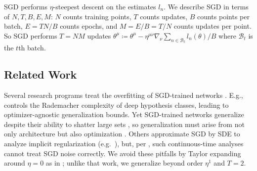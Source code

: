 \documentclass{article}
\theoremstyle{plain}
\theoremstyle{definition}
\newcommand{\Bb}{\mathcal{B}}
\begin{document}

        SGD performs $\eta$-steepest descent on the estimates $l_n$.
        We describe SGD in terms of $N,T,B,E,M$:
            $N$ counts training points,
            $T$ counts updates,
            $B$ counts points per batch,
            $E=TN/B$ counts epochs, 
            and $M=E/B=T/N$ counts updates per point.
        So SGD performs $T=NM$ updates
        $
            \theta^\mu
            \coloneqq
            \theta^\mu -
            \eta^{\mu\nu} \nabla_\nu
                \sum_{n\in \Bb_t} l_n(\theta) / B
        $
        where $\Bb_t$ is the $t$th batch.


\subsection{Related Work} \label{sect:related}


    Several research programs treat the overfitting of SGD-trained networks
    \citep{ne17a}.  E.g., \cite{ba17} controls the Rademacher complexity of
    deep hypothesis classes, leading to optimizer-agnostic generalization
    bounds.  Yet SGD-trained networks generalize despite their ability to
    shatter large sets \citep{zh17}, so generalization must arise from not only
    architecture but also optimization \citep{ne17b}.  Others approximate
    SGD by SDE to analyze implicit regularization (e.g.\ \cite{ch18}), but,
    per \cite{ya19a}, such continuous-time analyses cannot treat SGD noise
    correctly.
    We avoid these pitfalls by Taylor expanding around $\eta=0$ as in
    \cite{ro18}; unlike that work, we generalize beyond order $\eta^1$ and
    $T=2$.
    
\end{document}
